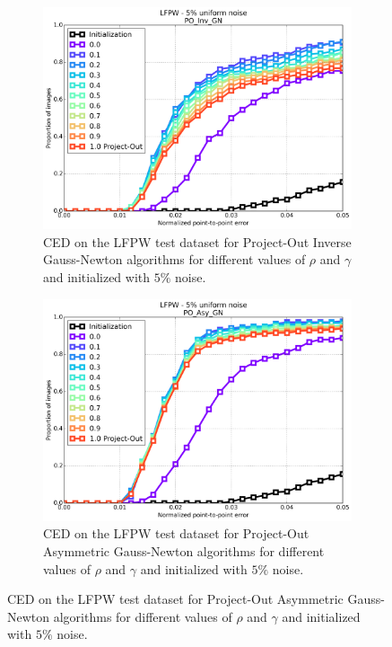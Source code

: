\begin{figure}[h!]
\begin{subfigure}{0.48\textwidth}
	    \includegraphics[width=\textwidth]{experiments/rho/ced_po_inv_gn_5.png}
	    \caption{CED on the LFPW test dataset for Project-Out Inverse Gauss-Newton algorithms for different values of $\rho$ and $\gamma$ and initialized with $5\%$ noise.}
	    \label{fig:ced_po_inv_gn}
	\end{subfigure}
	\par\medskip
	\begin{subfigure}{0.48\textwidth}
	    \includegraphics[width=\textwidth]{experiments/rho/ced_po_asy_gn_5.png}
	    \caption{CED on the LFPW test dataset for Project-Out Asymmetric Gauss-Newton algorithms for different values of $\rho$ and $\gamma$ and initialized with $5\%$ noise.}
	    \label{fig:ced_po_asy_gn}
	\end{subfigure}
	\hfill

\end{figure}
